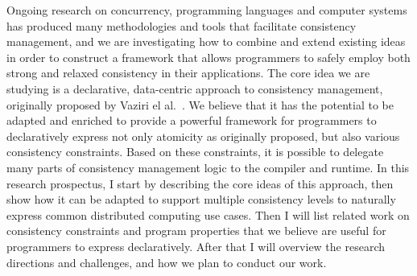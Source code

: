 \documentclass[]{usiinfprospectus}
\begin{document}
%
%

Ongoing research on concurrency, programming languages and computer systems has produced many methodologies and tools that facilitate consistency management, and we are investigating how to combine and extend existing ideas in order to construct a framework that allows programmers to safely employ both strong and relaxed consistency in their applications.
The core idea we are studying is a declarative, data-centric approach to consistency management, originally proposed by Vaziri el al.~\cite{Vaziri:2006:ASC:1111320.1111067}. We believe that it has the potential to be adapted and enriched to provide a powerful framework for programmers to declaratively express not only atomicity as originally proposed, but also various consistency constraints. Based on these constraints, it is possible to delegate many parts of consistency management logic to the compiler and runtime. In this research prospectus, I start by describing the core ideas of this approach, then show how it can be adapted to support multiple consistency levels to naturally express common distributed computing use cases. Then I will list related work on consistency constraints and program properties that we believe are useful for programmers to express  declaratively. After that I will overview the research directions and challenges, and how we plan to conduct our work.
\end{document}
